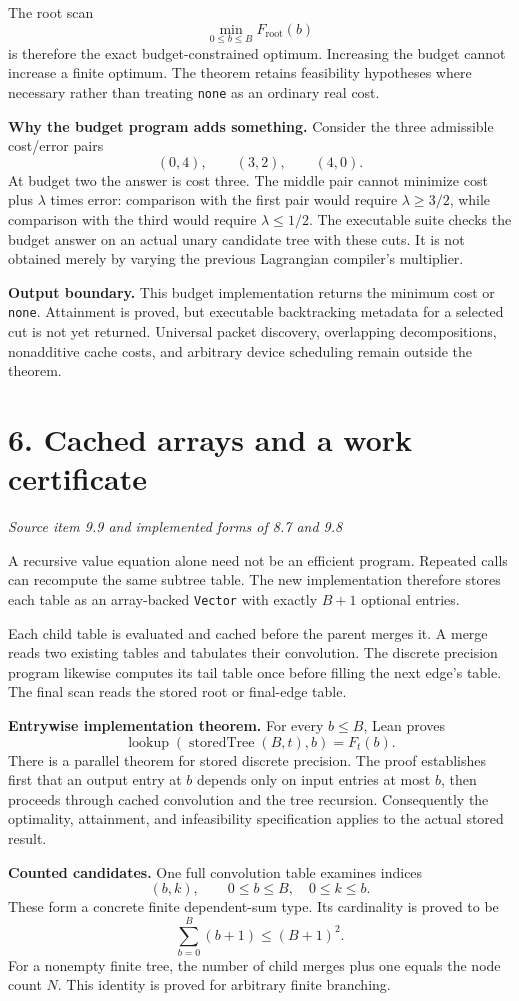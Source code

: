 \documentclass[11pt]{article}
\newcommand{\code}[1]{\texttt{\small #1}}
\newcommand{\pageheading}[2]{\section*{\color{ink}#1}\textit{#2}\par}
\begin{document}
The root scan
\[
\boxed{\min_{0\leq b\leq B}F_{\mathrm{root}}(b)}
\]
is therefore the exact budget-constrained optimum. Increasing the budget cannot increase a finite optimum. The theorem retains feasibility hypotheses where necessary rather than treating \code{none} as an ordinary real cost.

\textbf{Why the budget program adds something.} Consider the three admissible cost/error pairs
\[
(0,4),\qquad(3,2),\qquad(4,0).
\]
At budget two the answer is cost three. The middle pair cannot minimize cost plus $\lambda$ times error: comparison with the first pair would require $\lambda\geq3/2$, while comparison with the third would require $\lambda\leq1/2$. The executable suite checks the budget answer on an actual unary candidate tree with these cuts. It is not obtained merely by varying the previous Lagrangian compiler's multiplier.

\textbf{Output boundary.} This budget implementation returns the minimum cost or \code{none}. Attainment is proved, but executable backtracking metadata for a selected cut is not yet returned. Universal packet discovery, overlapping decompositions, nonadditive cache costs, and arbitrary device scheduling remain outside the theorem.

\newpage
\pageheading{6. Cached arrays and a work certificate}{Source item 9.9 and implemented forms of 8.7 and 9.8}
A recursive value equation alone need not be an efficient program. Repeated calls can recompute the same subtree table. The new implementation therefore stores each table as an array-backed \code{Vector} with exactly $B+1$ optional entries.

Each child table is evaluated and cached before the parent merges it. A merge reads two existing tables and tabulates their convolution. The discrete precision program likewise computes its tail table once before filling the next edge's table. The final scan reads the stored root or final-edge table.

\textbf{Entrywise implementation theorem.} For every $b\leq B$, Lean proves
\[
\operatorname{lookup}(\operatorname{storedTree}(B,t),b)=F_t(b).
\]
There is a parallel theorem for stored discrete precision. The proof establishes first that an output entry at $b$ depends only on input entries at most $b$, then proceeds through cached convolution and the tree recursion. Consequently the optimality, attainment, and infeasibility specification applies to the actual stored result.

\textbf{Counted candidates.} One full convolution table examines indices
\[
(b,k),\qquad 0\leq b\leq B,\quad0\leq k\leq b.
\]
These form a concrete finite dependent-sum type. Its cardinality is proved to be
\[
\sum_{b=0}^B(b+1)\leq(B+1)^2.
\]
For a nonempty finite tree, the number of child merges plus one equals the node count $N$. This identity is proved for arbitrary finite branching.
\end{document}
